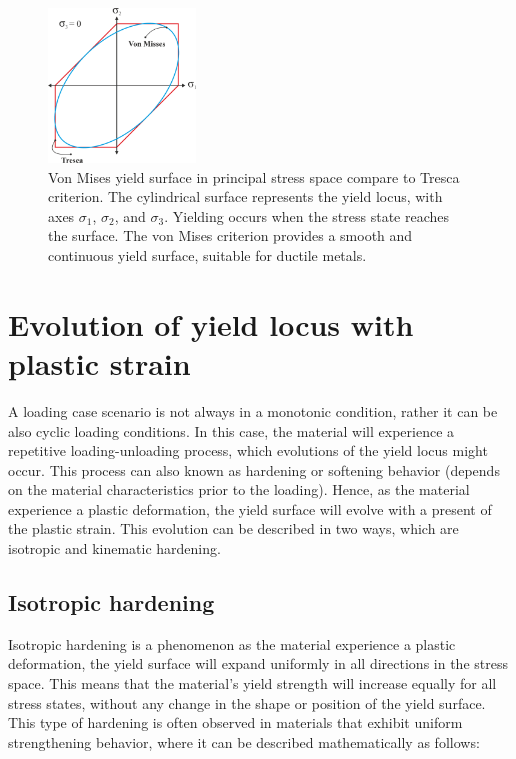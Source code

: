 \documentclass[12pt]{article}
\begin{document}
\begin{figure}[H]
    \centering
    \includegraphics[width=0.35\textwidth]{images/VonMises.png}
    \caption{Von Mises yield surface in principal stress space compare to Tresca criterion. 
    The cylindrical surface represents the yield locus, with axes $\sigma_1$, $\sigma_2$, and $\sigma_3$. 
    Yielding occurs when the stress state reaches the surface. 
    The von Mises criterion provides a smooth and continuous yield surface, suitable for ductile metals.\cite{hosford2005}}
    \label{fig:vonmises_surface}
\end{figure}


\section{Evolution of yield locus with plastic strain}

\hspace{2em}A loading case scenario is not always in a monotonic condition, 
rather it can be also cyclic loading conditions. In this case,
the material will experience a repetitive loading-unloading process, which evolutions of the yield locus might occur. This process can also 
known as hardening or softening behavior (depends on the material characteristics prior to the loading). Hence, as the material
experience a plastic deformation, the yield surface will evolve with a present of the plastic strain. This 
evolution can be described in two ways, which are isotropic and kinematic hardening. 


\subsection{Isotropic hardening}

\hspace{2em}Isotropic hardening is a phenomenon as the material experience a plastic deformation,
the yield surface will expand uniformly in all directions in the stress space. This means that the material's
yield strength will increase equally for all stress states, without any change in the shape or position
of the yield surface. This type of hardening is often observed in materials that exhibit uniform
strengthening behavior, where it can be described mathematically as follows:
\end{document}
